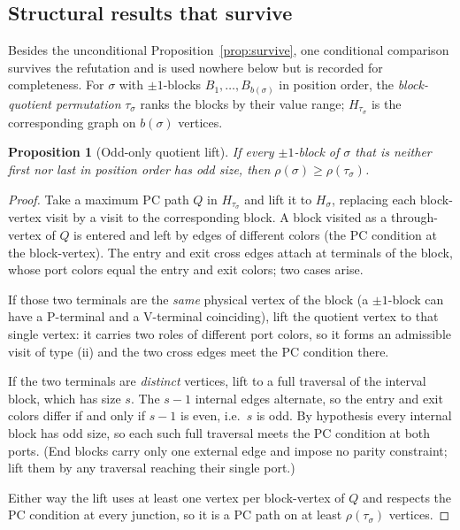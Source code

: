 \documentclass[11pt]{article}
\newtheorem{proposition}[theorem]{Proposition}
\theoremstyle{definition}
\begin{document}
\subsection{Structural results that survive}\label{subsec:survive}

Besides the unconditional Proposition~\ref{prop:survive}, one conditional comparison
survives the refutation and is used nowhere below but is recorded for completeness. For
$\sigma$ with $\pm1$-blocks $B_1,\dots,B_{b(\sigma)}$ in position order, the
\emph{block-quotient permutation} $\tau_\sigma$ ranks the blocks by their value range;
$H_{\tau_\sigma}$ is the corresponding graph on $b(\sigma)$ vertices.

\begin{proposition}[Odd-only quotient lift]\label{prop:quotient}
If every $\pm1$-block of $\sigma$ that is neither first nor last in position order has
odd size, then $\rho(\sigma)\ge\rho(\tau_\sigma)$.
\end{proposition}

\begin{proof}
Take a maximum PC path $Q$ in $H_{\tau_\sigma}$ and lift it to $H_\sigma$, replacing
each block-vertex visit by a visit to the corresponding block. A block visited as a
through-vertex of $Q$ is entered and left by edges of different colors (the PC condition
at the block-vertex). The entry and exit cross edges attach at terminals of the block,
whose port colors equal the entry and exit colors; two cases arise.

If those two terminals are the \emph{same} physical vertex of the block (a $\pm1$-block
can have a P-terminal and a V-terminal coinciding), lift the quotient vertex to that
single vertex: it carries two roles of different port colors, so it forms an admissible
visit of type (ii) and the two cross edges meet the PC condition there.

If the two terminals are \emph{distinct} vertices, lift to a full traversal of the
interval block, which has size $s$. The $s-1$ internal edges alternate, so the entry and
exit colors differ if and only if $s-1$ is even, i.e.\ $s$ is odd. By hypothesis every
internal block has odd size, so each such full traversal meets the PC condition at both
ports. (End blocks carry only one external edge and impose no parity constraint; lift
them by any traversal reaching their single port.)

Either way the lift uses at least one vertex per block-vertex of $Q$ and respects the PC
condition at every junction, so it is a PC path on at least $\rho(\tau_\sigma)$ vertices.
\end{proof}
\end{document}
